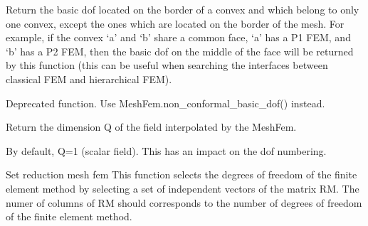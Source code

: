 \documentclass[a4paper,11pt,english]{sphinxmanual}
\begin{document}
\begin{fulllineitems}
\begin{fulllineitems}
Return the basic dof located on the border of a convex and which belong
to only one convex, except the ones which are located on the border
of the mesh.  For example, if the convex ‘a’ and ‘b’ share a common
face, ‘a’ has a P1 FEM, and ‘b’ has a P2 FEM, then the basic dof on the
middle of the face will be returned by this function (this can be
useful when searching the interfaces between classical FEM and
hierarchical FEM).

\end{fulllineitems}


\begin{fulllineitems}
\label{\detokenize{python/cmdref_MeshFem:getfem.MeshFem.non_conformal_dof}}
Deprecated function. Use MeshFem.non\_conformal\_basic\_dof() instead.

\end{fulllineitems}


\begin{fulllineitems}
\label{\detokenize{python/cmdref_MeshFem:getfem.MeshFem.qdim}}
Return the dimension Q of the field interpolated by the MeshFem.

By default, Q=1 (scalar field). This has an impact on the dof numbering.

\end{fulllineitems}


\begin{fulllineitems}
\label{\detokenize{python/cmdref_MeshFem:getfem.MeshFem.reduce_meshfem}}
Set reduction mesh fem
This function selects the degrees of freedom of the finite element
method by selecting a set of independent vectors of the matrix RM.
The numer of columns of RM should corresponds to the number of degrees
of freedom of the finite element method.

\end{fulllineitems}


\end{fulllineitems}
\end{document}
